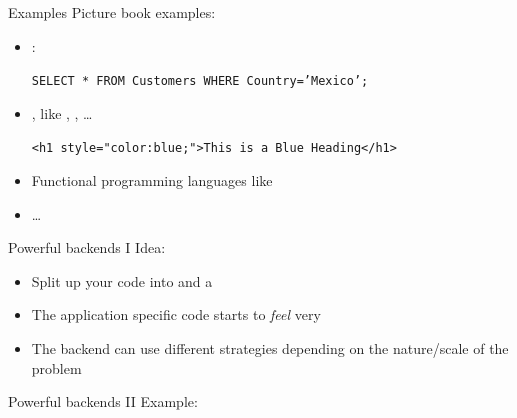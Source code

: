 \begin{frame}{Examples}
	Picture book examples:
	\begin{itemize}
		\item {} :
		\begin{center}
			\texttt{SELECT * FROM Customers WHERE Country='Mexico';}
		\end{center}
		\item {}, like ,  , \dots
		\begin{center}
			\texttt{<h1 style="color:blue;">This is a Blue Heading</h1>
			}
		\end{center}
		\item Functional programming languages like  
		\item \dots
\end{itemize}
\end{frame}
%
\begin{frame}{Powerful backends I}
	Idea:
	\begin{itemize}
		\item Split up your code into   and a  
		\item The application specific code starts to \emph{feel} very 
		\item The backend can use different strategies depending on the nature/scale of the problem
	\end{itemize}
\end{frame}
%
\begin{frame}{Powerful backends II}
	Example:
	\inputminted{python}{code/paradigms/dp/dataframes.py}
\end{frame}
%
%

